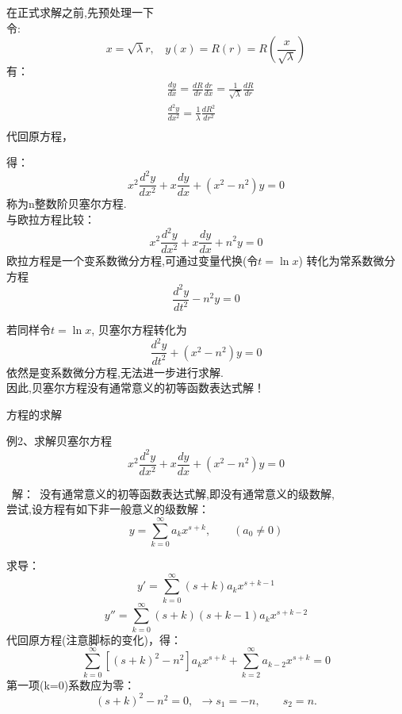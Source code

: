 	
	在正式求解之前,先预处理一下\\
	令:
	\begin{equation*}
		x=\sqrt{\lambda} r, ~~~~y(x)= R(r) =R(\frac{x}{\sqrt{\lambda}})
	\end{equation*}
	有： 
	\[
	\begin{aligned}
		&\frac{dy}{dx} = \frac{dR}{dr} \frac{dr}{dx} = \frac{1}{ \sqrt{\lambda}} \frac{dR}{dr}\\
		&\frac{d^2y}{dx^2} = \frac{1}{\lambda} \frac{dR^2}{dr^2}\\
	\end{aligned}	
	\]
	代回原方程，



	得：
	\begin{equation*}
		\boxed{x^2\frac{d^2y}{dx^2} + x\frac{dy}{dx} +(x^2 -n^2)y=0}
	\end{equation*}
	称为n整数阶贝塞尔方程.\\ \vspace{1em}
	{\Bullet}与欧拉方程比较：
	\begin{equation*}
		x^2\frac{d^2y}{dx^2} + x\frac{dy}{dx} +n^2y=0
	\end{equation*}
	欧拉方程是一个变系数微分方程,可通过变量代换(令$t=\ln x $) 转化为常系数微分方程
	\[ \frac{d^2y}{dt^2} - n^2y=0 \]



	若同样令$t=\ln x $, 贝塞尔方程转化为 
	\[ \frac{d^2y}{dt^2} +(x^2-n^2)y=0 \]
	依然是变系数微分方程,无法进一步进行求解.\\
	因此,贝塞尔方程没有通常意义的初等函数表达式解！



	{方程的求解}
	\begin{example} {例2、求解贝塞尔方程}
		\begin{equation*}
			x^2\frac{d^2y}{dx^2} + x\frac{dy}{dx} +( x^2 -n^2)y=0
		\end{equation*}	
	\end{example}
	{\alert{ 解：}}~没有通常意义的初等函数表达式解,即没有通常意义的级数解,\\
	尝试,设方程有如下非一般意义的级数解：
	\begin{equation*}
		y=\sum\limits_{k=0}^{\infty} a_k x^{s+k},  \qquad (a_0 \not =0)
	\end{equation*}	



	求导：
	\begin{equation*}
		y'=\sum\limits_{k=0}^{\infty} (s+k) a_k x^{s+k-1}
	\end{equation*}	
	\begin{equation*}
		y''=\sum\limits_{k=0}^{\infty} (s+k) (s+k-1) a_k x^{s+k-2}
	\end{equation*}	
	代回原方程(注意脚标的变化)，得：
	\begin{equation*}
		\sum\limits_{k=0}^{\infty} [(s+k) ^2 -n^2]  a_k x^{s+k} + \sum\limits_{k=2}^{\infty}  a_{k-2} x^{s+k} =0
	\end{equation*}	
	第一项(k=0)系数应为零：
	\begin{equation*}
		(s+k) ^2 -n^2=0,~~ \to s_1=-n, \qquad s_2=n. 
	\end{equation*}	



